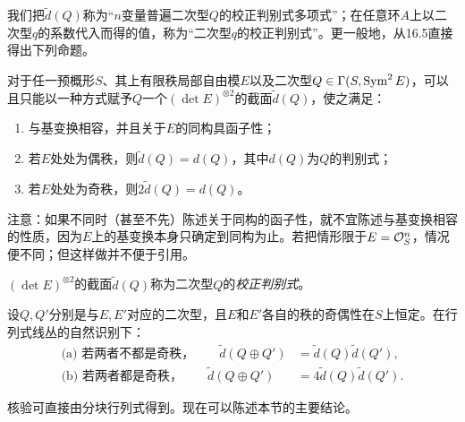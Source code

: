 我们把$\widetilde d(Q)$称为“$n$变量普遍二次型$Q$的校正判别式多项式”；在任意环$A$上以二次型$q$的系数代入而得的值，称为“二次型$q$的校正判别式”。更一般地，从16.5直接得出下列命题。

对于任一预概形$S$、其上有限秩局部自由模$E$以及二次型$Q\in\Gamma(S,\operatorname{Sym}^2 E)$，可以且只能以一种方式赋予$Q$一个$(\det E)^{\otimes2}$的截面$\widetilde d(Q)$，使之满足：
\begin{enumerate}
\renewcommand{\labelenumi}{(\alph{enumi})}
\item 与基变换相容，并且关于$E$的同构具函子性；
\item 若$E$处处为偶秩，则$\widetilde d(Q)=d(Q)$，其中$d(Q)$为$Q$的判别式；
\item 若$E$处处为奇秩，则$2\widetilde d(Q)=d(Q)$。
\end{enumerate}

注意：如果不同时（甚至不先）陈述关于同构的函子性，就不宜陈述与基变换相容的性质，因为$E$上的基变换本身只确定到同构为止。若把情形限于$E=\mathcal O_S^n$，情况便不同；但这样做并不便于引用。

$(\det E)^{\otimes2}$的截面$\widetilde d(Q)$称为二次型$Q$的\emph{校正判别式}。

设$Q,Q'$分别是与$E,E'$对应的二次型，且$E$和$E'$各自的秩的奇偶性在$S$上恒定。在行列式线丛的自然识别下：
\begin{align*}
\text{(a) 若两者不都是奇秩，}\qquad
\widetilde d(Q\oplus Q')&=\widetilde d(Q)\widetilde d(Q'),\\
\text{(b) 若两者都是奇秩，}\qquad
\widetilde d(Q\oplus Q')&=4\widetilde d(Q)\widetilde d(Q').
\end{align*}

核验可直接由分块行列式得到。现在可以陈述本节的主要结论。
\par\endgroup
